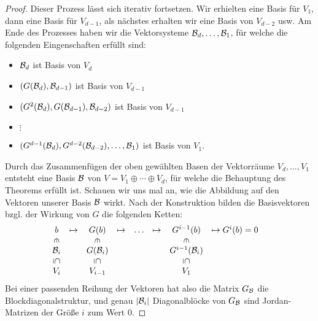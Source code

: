 \begin{proof}
	Dieser Prozess lässt sich iterativ fortsetzen. Wir erhielten eine Basis für $V_1$, dann eine Basis für $V_{d-1}$, als nächstes erhalten wir eine Basis von $V_{d-2}$ usw. Am Ende des Prozesses haben wir die Vektorsysteme $\mathcal{B}_d,\ldots,\mathcal{B}_1$, für welche die folgenden Eingenschaften erfüllt sind: 
	\begin{itemize}
		\item[] $\mathcal{B}_d$ ist Basis von $V_d$
		\item[] $(G(\mathcal{B}_d),\mathcal{B}_{d-1})$ ist Basis von $V_{d-1}$
		\item[] $(G^2(\mathcal{B}_d),G(\mathcal{B}_{d-1}), \mathcal{B}_{d-2})$ ist Basis von $V_{d-1}$
		\item[] $\vdots$
		\item[] $(G^{d-1}(\mathcal{B}_d), G^{d-2}(\mathcal{B}_{d-2}),\ldots, \mathcal{B}_1)$ ist Basis von $V_1$. 
	\end{itemize} 	
	Durch das Zusammenfügen der oben gewählten Basen der Vektorräume $V_d,\ldots,V_1$ entsteht eine Basis $\mathcal{B}$ von $V = V_1 \oplus \cdots \oplus V_d$, für welche die Behauptung des Theorems erfüllt ist. 
	Schauen wir uns mal an, wie die Abbildung auf den Vektoren unserer Basis $\mathcal{B}$ wirkt. Nach der Konstruktion bilden die Basisvektoren bzgl. der Wirkung von $G$ die folgenden Ketten: 
	\begin{equation*}
		\begin{array}{ccccccccc}
			b & \mapsto & G(b) & \mapsto & \ldots & \mapsto & G^{i-1}(b) & \mapsto G^i(b) = 0 \\
			\vertical{\in} && \vertical{\in} &&&& \vertical{\in} && \\
			\B_i && G(\B_i) &&&& G^{i-1}(\B_i) && \\
			\vertical{\subseteq} && \vertical{\subseteq} &&&& \vertical{\subseteq} && \\
			V_i && V_{i-1} &&&& V_1 &&
		\end{array}
	\end{equation*}
	Bei einer passenden Reihung der Vektoren hat also die Matrix $G_{\mathcal{B}}$ die Blockdiagonalstruktur, und genau $|\mathcal{B}_i|$ Diagonalblöcke von $G_{\mathcal{B}}$ sind Jordan-Matrizen der Größe $i$ zum Wert $0$. 
	

\end{proof}
